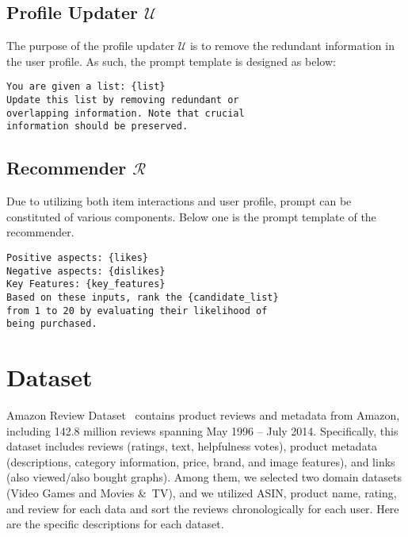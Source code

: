 \subsection{Profile Updater $\mathcal{U}$}
The purpose of the profile updater $\mathcal{U}$ is to remove the redundant information in the user profile. As such, the prompt template is designed as below: 

\begin{tcolorbox}[fonttitle=\small\bfseries,
fontupper=\scriptsize\sffamily,
fontlower=\fon{put},
enhanced,
left=2pt, right=2pt, top=2pt, bottom=2pt,
title=Prompt template for User Profile Updater $\mathcal{U}$]
\begin{lstlisting}[]
You are given a list: {list}
Update this list by removing redundant or
overlapping information. Note that crucial 
information should be preserved.
\end{lstlisting}
\end{tcolorbox}


\subsection{Recommender $\mathcal{R}$}
Due to utilizing both item interactions and user profile, prompt can be constituted of various components. Below one is the prompt template of the recommender.  
\begin{tcolorbox}[fonttitle=\small\bfseries,
fontupper=\scriptsize\sffamily,
fontlower=\fon{put},
enhanced,
left=2pt, right=2pt, top=2pt, bottom=2pt,
title=Prompt template for Recommender $\mathcal{R}$]
\begin{lstlisting}[]
Positive aspects: {likes}
Negative aspects: {dislikes}
Key Features: {key_features}
Based on these inputs, rank the {candidate_list}
from 1 to 20 by evaluating their likelihood of 
being purchased.
\end{lstlisting}
\end{tcolorbox}

\section{Dataset}
\label{app:dataset}
Amazon Review Dataset~\cite{ni2019justifying} contains product reviews and metadata from Amazon, including 142.8 million reviews spanning May 1996 -- July 2014. Specifically, this dataset includes reviews (ratings, text, helpfulness votes), product metadata (descriptions, category information, price, brand, and image features), and links (also viewed/also bought graphs). Among them, we selected two domain datasets (Video Games and Movies \&\ TV), and we utilized ASIN, product name, rating, and review for each data and sort the reviews chronologically for each user. Here are the specific descriptions for each dataset.

